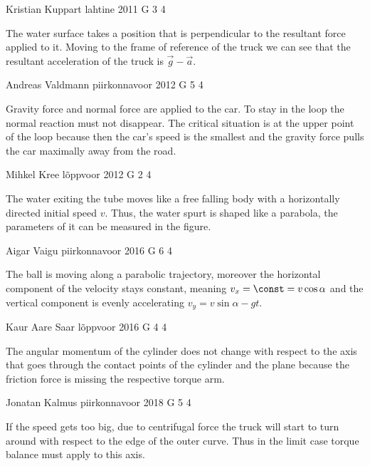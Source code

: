 \documentclass[11pt]{article}
\begin{document}
{Kristian Kuppart} %
{lahtine} %
{2011} %
{G 3} %
{4} %
{

\ifEngHint
The water surface takes a position that is perpendicular to the resultant force applied to it. Moving to the frame of reference of the truck we can see that the resultant acceleration of the truck is $\vec g - \vec a$.
\fi
}

{Andreas Valdmann} %
{piirkonnavoor} %
{2012} %
{G 5} %
{4} %
{

\ifEngHint
Gravity force and normal force are applied to the car. To stay in the loop the normal reaction must not disappear. The critical situation is at the upper point of the loop because then the car’s speed is the smallest and the gravity force pulls the car maximally away from the road.
\fi
}

{Mihkel Kree} %
{lõppvoor} %
{2012} %
{G 2} %
{4} %
{

\ifEngHint
The water exiting the tube moves like a free falling body with a horizontally directed initial speed $v$. Thus, the water spurt is shaped like a parabola, the parameters of it can be measured in the figure.
\fi
}

{Aigar Vaigu} %
{piirkonnavoor} %
{2016} %
{G 6} %
{4} %
{

\ifEngHint
The ball is moving along a parabolic trajectory, moreover the horizontal component of the velocity stays constant, meaning $v_x = \const = v\cos\alpha$ and the vertical component is evenly accelerating $v_y = v\sin\alpha - gt$.
\fi
}

{Kaur Aare Saar} %
{lõppvoor} %
{2016} %
{G 4} %
{4} %
{

\ifEngHint
The angular momentum of the cylinder does not change with respect to the axis that goes through the contact points of the cylinder and the plane because the friction force is missing the respective torque arm.
\fi
}

{Jonatan Kalmus} %
{piirkonnavoor} %
{2018} %
{G 5} %
{4} %
{

\ifEngHint
If the speed gets too big, due to centrifugal force the truck will start to turn around with respect to the edge of the outer curve. Thus in the limit case torque balance must apply to this axis.
\fi
}
\end{document}
